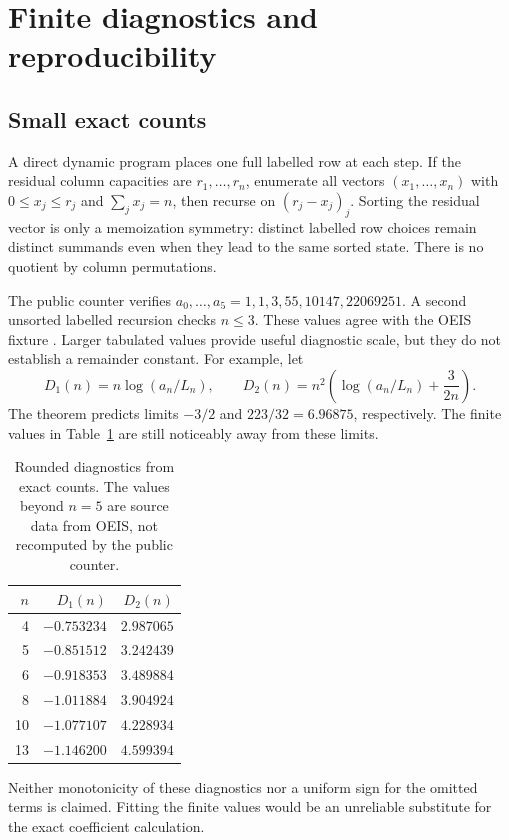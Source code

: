 \section{Finite diagnostics and reproducibility}\label{sqt:sec:computation}
\subsection{Small exact counts}
A direct dynamic program places one full labelled row at each step. If the residual column capacities are $r_1,\ldots,r_n$, enumerate all vectors $(x_1,\ldots,x_n)$ with $0\leq x_j\leq r_j$ and $\sum_jx_j=n$, then recurse on $(r_j-x_j)_j$. Sorting the residual vector is only a memoization symmetry: distinct labelled row choices remain distinct summands even when they lead to the same sorted state. There is no quotient by column permutations.

The public counter verifies $a_0,\ldots,a_5=1,1,3,55,10147,22069251$. A second unsorted labelled recursion checks $n\leq3$. These values agree with the OEIS fixture \cite{oeis}. Larger tabulated values provide useful diagnostic scale, but they do not establish a remainder constant. For example, let
\[
D_1(n)=n\log(a_n/L_n),\qquad
D_2(n)=n^2\left(\log(a_n/L_n)+\frac3{2n}\right).
\]
The theorem predicts limits $-3/2$ and $223/32=6.96875$, respectively. The finite values in Table~\ref{sqt:tab:diagnostics} are still noticeably away from these limits.

\begin{table}[!htbp]
\centering
\caption{Rounded diagnostics from exact counts. The values beyond $n=5$ are source data from OEIS, not recomputed by the public counter.}\label{sqt:tab:diagnostics}
\begin{tabular}{rrr}
\toprule
$n$ & $D_1(n)$ & $D_2(n)$\\
\midrule
4 & $-0.753234$ & $2.987065$\\
5 & $-0.851512$ & $3.242439$\\
6 & $-0.918353$ & $3.489884$\\
8 & $-1.011884$ & $3.904924$\\
10 & $-1.077107$ & $4.228934$\\
13 & $-1.146200$ & $4.599394$\\
\bottomrule
\end{tabular}
\end{table}

Neither monotonicity of these diagnostics nor a uniform sign for the omitted terms is claimed. Fitting the finite values would be an unreliable substitute for the exact coefficient calculation.

